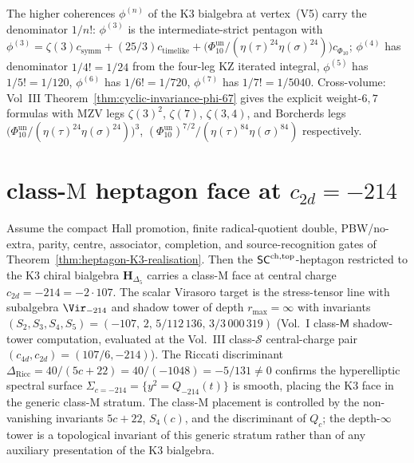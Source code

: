\begin{remark}
\label{rem:heptagon-K3-denominator}
The higher coherences $\phi^{(n)}$ of the K3 bialgebra at vertex~(V5)
carry the denominator $1/n!$: $\phi^{(3)}$ is the intermediate-strict
pentagon with $\phi^{(3)} = \zeta(3) c_{\mathrm{symm}} +
(25/3) c_{\mathrm{timelike}}
+ \bigl(\Phi_{10}^{\mathrm{un}}/(\eta(\tau)^{24}\eta(\sigma)^{24})\bigr)c_{\Phi_{10}}$;
$\phi^{(4)}$ has denominator $1/4! = 1/24$ from the four-leg KZ iterated
integral, $\phi^{(5)}$ has $1/5! = 1/120$, $\phi^{(6)}$ has $1/6! = 1/720$,
$\phi^{(7)}$ has $1/7! = 1/5040$. Cross-volume: Vol~III
Theorem~\ref{thm:cyclic-invariance-phi-67} gives the explicit
weight-$6, 7$ formulas with MZV legs $\zeta(3)^2$, $\zeta(7)$,
$\zeta(3, 4)$, and Borcherds legs
\(\bigl(\Phi_{10}^{\mathrm{un}}/(\eta(\tau)^{24}\eta(\sigma)^{24})\bigr)^3\),
\((\Phi_{10}^{\mathrm{un}})^{7/2}/(\eta(\tau)^{84}\eta(\sigma)^{84})\) respectively.
\end{remark}

\section{class-$\mathrm M$ heptagon face at
$c_{2d} = -214$}
\label{sec:schtop-heptagon-supplement-ii}

\begin{remark}[K3 heptagon face at $c_{2d} = -214 = -2\cdot 107$;
\ClaimStatusConditional]
\label{rem:schtop-heptagon-k3-face}
Assume the compact Hall promotion, finite radical-quotient double,
PBW/no-extra, parity, centre, associator, completion, and
source-recognition gates of
Theorem~\ref{thm:heptagon-K3-realisation}. Then the
$\mathsf{SC}^{\mathrm{ch},\mathrm{top}}$-heptagon restricted to the K3 chiral bialgebra
$\mathbf H_{\Delta_5}$ carries a class-$\mathrm M$ face at central
charge $c_{2d} = -214 = -2\cdot 107$. The scalar Virasoro target is
the stress-tensor line with subalgebra $\Vir_{-214}$ and shadow tower
of depth $r_{\max} = \infty$ with invariants
$(S_2, S_3, S_4, S_5) = (-107,\, 2,\, 5/112\,136,\, 3/3\,000\,319)$
(Vol.~I class-$\mathsf M$ shadow-tower computation, evaluated at the
Vol.~III class-$\mathcal S$ central-charge pair
$(c_{4d},c_{2d})=(107/6,-214)$).
The Riccati discriminant
$\Delta_{\mathrm{Ricc}} = 40/(5c + 22) = 40/(-1048) = -5/131 \ne 0$
confirms the hyperelliptic spectral surface
$\Sigma_{c = -214} = \{y^2 = Q_{-214}(t)\}$ is smooth, placing the
K3 face in the generic class-$\mathrm M$ stratum. The class-$\mathrm M$
placement is controlled by the non-vanishing invariants
$5c+22$, $S_4(c)$, and the discriminant of $Q_c$; the depth-$\infty$
tower is a topological invariant of this generic stratum rather than
of any auxiliary presentation of the K3 bialgebra.
\end{remark}

